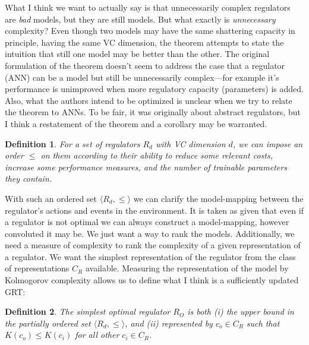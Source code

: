 \documentclass[11pt, oneside]{article}   	%
\newtheorem{theorem}{Definition}
\begin{document}


What I think we want to actually say is that unnecessarily complex regulators are \emph{bad} models, but they are still models.  But what exactly is \emph{unnecessary} complexity?  Even though two models may have the same shattering capacity in principle, having the same VC dimension, the theorem attempts to state the intuition that still one model may be better than the other.  The original formulation of the theorem doesn't seem to address the case that a regulator (ANN) can be a model but still be unnecessarily complex---for example it's performance is unimproved when more regulatory capacity (parameters) is added.  Also, what the authors intend to be optimized is unclear when we try to relate the theorem to ANNs.  To be fair, it was originally about abstract regulators, but I think a restatement of the theorem and a corollary may be warranted.

\begin{theorem}
For a set of regulators $R_d$ with VC dimension $d$, we can impose an order $\leq$ on them according to their ability to reduce some relevant costs, increase some performance measures, and the number of trainable parameters they contain.
\end{theorem}

With such an ordered set $\langle R_d,\leq \rangle$ we can clarify the model-mapping between the regulator's actions and events in the environment.  It is taken as given that even if a regulator is not optimal we can always construct a model-mapping, however convoluted it may be.  We just want a way to rank the models.  Additionally, we need a measure of complexity to rank the complexity of a given representation of a regulator.  We want the simplest representation of the regulator from the class of representations $C_R$ available.  Measuring the representation of the model by Kolmogorov complexity allows us to define what I think is a sufficiently updated GRT:

\begin{theorem}
The simplest optimal regulator $R_O$ is both (i) the upper bound in the partially ordered set $\langle R_d,\leq \rangle$, and (ii) represented by $c_o \in C_R$ such that $K(c_o)\leq K(c_i)$ for all other $c_i \in C_R$. 
\end{theorem}
\end{document}
